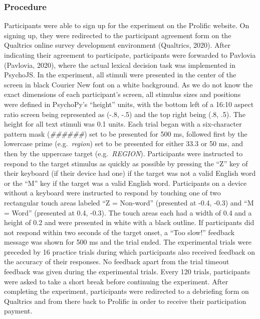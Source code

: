 \documentclass[
  english,
  man,floatsintext]{apa6}
\begin{document}
\hypertarget{procedure}{%
\subsubsection{Procedure}\label{procedure}}

Participants were able to sign up for the experiment on the Prolific website. On signing up, they were redirected to the participant agreement form on the Qualtrics online survey development environment (Qualtrics, 2020). After indicating their agreement to participate, participants were forwarded to Pavlovia (Pavlovia, 2020), where the actual lexical decision task was implemented in PsychoJS. In the experiment, all stimuli were presented in the center of the screen in black Courier New font on a white background. As we do not know the exact dimensions of each participant's screen, all stimulus sizes and positions were defined in PsychoPy's ``height'' units, with the bottom left of a 16:10 aspect ratio screen being represented as (-.8, -.5) and the top right being (.8, .5). The height for all text stimuli was 0.1 units. Each trial began with a six-character pattern mask (\emph{\#\#\#\#\#\#}) set to be presented for 500 ms, followed first by the lowercase prime (e.g.~\emph{region}) set to be presented for either 33.3 or 50 ms, and then by the uppercase target (e.g.~\emph{REGION}). Participants were instructed to respond to the target stimulus as quickly as possible by pressing the ``Z'' key of their keyboard (if their device had one) if the target was not a valid English word or the ``M'' key if the target was a valid English word. Participants on a device without a keyboard were instructed to respond by touching one of two rectangular touch areas labeled ``Z = Non-word'' (presented at -0.4, -0.3) and ``M = Word'' (presented at 0.4, -0.3). The touch areas each had a width of 0.4 and a height of 0.2 and were presented in white with a black outline. If participants did not respond within two seconds of the target onset, a ``Too slow!'' feedback message was shown for 500 ms and the trial ended. The experimental trials were preceded by 16 practice trials during which participants also received feedback on the accuracy of their responses. No feedback apart from the trial timeout feedback was given during the experimental trials. Every 120 trials, participants were asked to take a short break before continuing the experiment. After completing the experiment, participants were redirected to a debriefing form on Qualtrics and from there back to Prolific in order to receive their participation payment.
\end{document}
